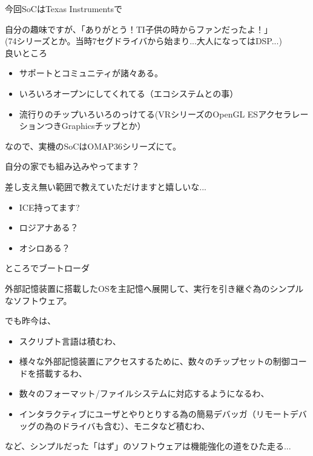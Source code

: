 \begin{frame}{今回SoCはTexas Instrumentsで}

自分の趣味ですが、「ありがとう！TI子供の時からファンだったよ！」\\
(74シリーズとか。当時7セグドライバから始まり...大人になってはDSP...)\\

良いところ\\
\begin{itemize}
\item サポートとコミュニティが諸々ある。
\item いろいろオープンにしてくれてる（エコシステムとの事）
\item 流行りのチップいろいろのっけてる(VRシリーズのOpenGL ESアクセラレーションつきGraphicsチップとか）
\end{itemize}

なので、実機のSoCはOMAP36シリーズにて。

\end{frame}


\begin{frame}{自分の家でも組み込みやってます？}

差し支え無い範囲で教えていただけますと嬉しいな...

\begin{itemize}
\item ICE持ってます?
\item ロジアナある？
\item オシロある？
\end{itemize}

\end{frame}

\begin{frame}{ところでブートローダ}

外部記憶装置に搭載したOSを主記憶へ展開して、実行を引き継ぐ為のシンプルなソフトウェア。

でも昨今は、
\begin{itemize}
\item スクリプト言語は積むわ、
\item 様々な外部記憶装置にアクセスするために、数々のチップセットの制御コードを搭載するわ、
\item 数々のフォーマット/ファイルシステムに対応するようになるわ、
\item インタラクティブにユーザとやりとりする為の簡易デバッガ（リモートデバッグの為のドライバも含む）、モニタなど積むわ、
\end{itemize}

など、シンプルだった「はず」のソフトウェアは機能強化の道をひた走る...

\end{frame}

